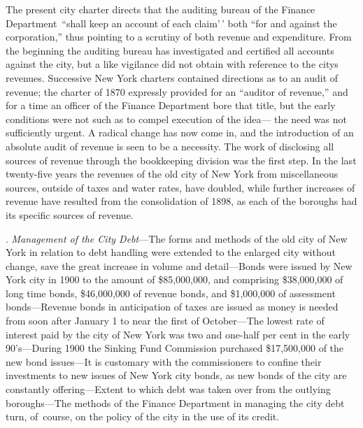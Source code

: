 \documentclass[twoside,symmetric,nobib,justified]{tufte-book}
\begin{document}
The present city charter directs that the auditing bureau of the Finance
Department~``shall keep an account of each claim'\,' both ``for and
against the corporation,'' thus pointing to a scrutiny of both revenue
and expenditure. From the beginning the auditing bureau has investigated
and certified all accounts against the city, but a like vigilance did
not obtain with reference to the city\textquotesingle s revenues.
Successive New York charters contained directions as to an audit of
revenue; the charter of 1870 expressly provided for an ``auditor of
revenue,'' and for a time an officer of the Finance Department bore that
title, but the early conditions were not such as to compel execution of
the idea--- the need was not sufficiently urgent. A radical change has
now come in, and the introduction of an absolute audit of revenue is
seen to be a necessity. The work of disclosing all sources of revenue
through the bookkeeping division was the first step. In the last
twenty-five years the revenues of the old city of New York from
miscellaneous sources, outside of taxes and water rates, have doubled,
while further increases of revenue have resulted from the consolidation
of 1898, as each of the boroughs had its specific sources of revenue.~~

\vspace{.15in}

. \emph{Management of the City Debt}---The forms and methods of the old
city of New York in relation to debt handling were extended to the
enlarged city without change, save the great increase in volume and
detail---Bonds were issued by New York city in 1900 to the amount of
\$85,000,000, and comprising \$38,000,000 of long time bonds,
\$46,000,000 of revenue bonds, and \$1,000,000 of assessment
bonds---Revenue bonds in anticipation of taxes are issued as money is
needed from soon after January 1 to near the first of October---The
lowest rate of interest paid by the city of New York was two and
one-half per cent in the early 90's---During 1900 the Sinking Fund
Commission purchased \$17,500,000 of the new bond issues---It is
customary with the commissioners to confine their investments to new
issues of New York city bonds, as new bonds of the city are constantly
offering---Extent to which debt was taken over from the outlying
boroughs---The methods of the Finance Department in managing the city
debt turn, of~course, on the policy of the city in the use of its
credit.~~

\enlargethispage{\baselineskip}
\end{document}
